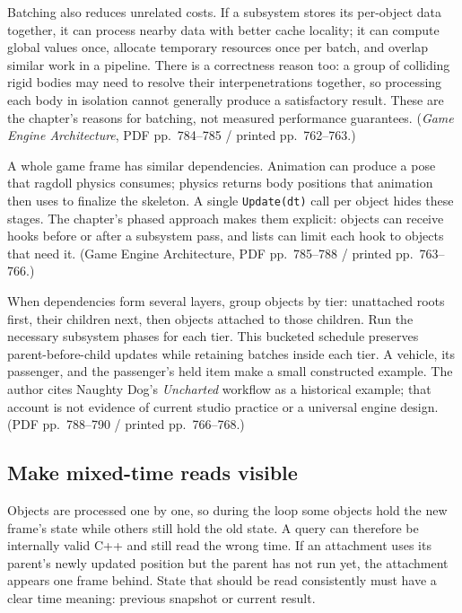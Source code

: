 Batching also reduces unrelated costs. If a subsystem stores its per-object data together, it can process nearby data with better cache locality; it can compute global values once, allocate temporary resources once per batch, and overlap similar work in a pipeline. There is a correctness reason too: a group of colliding rigid bodies may need to resolve their interpenetrations together, so processing each body in isolation cannot generally produce a satisfactory result. These are the chapter's reasons for batching, not measured performance guarantees. (\emph{Game Engine Architecture}, PDF pp.~784--785 / printed pp.~762--763.)

A whole game frame has similar dependencies. Animation can produce a pose that ragdoll physics consumes; physics returns body positions that animation then uses to finalize the skeleton. A single \texttt{Update(dt)} call per object hides these stages. The chapter's phased approach makes them explicit: objects can receive hooks before or after a subsystem pass, and lists can limit each hook to objects that need it. (Game Engine Architecture, PDF pp.~785--788 / printed pp.~763--766.)

When dependencies form several layers, group objects by tier: unattached roots first, their children next, then objects attached to those children. Run the necessary subsystem phases for each tier. This bucketed schedule preserves parent-before-child updates while retaining batches inside each tier. A vehicle, its passenger, and the passenger's held item make a small constructed example. The author cites Naughty Dog's \emph{Uncharted} workflow as a historical example; that account is not evidence of current studio practice or a universal engine design. (PDF pp.~788--790 / printed pp.~766--768.)

\subsection{Make mixed-time reads visible}\label{05-engine-i-ch014-make-mixed-time-reads-visible}

Objects are processed one by one, so during the loop some objects hold the new frame's state while others still hold the old state. A query can therefore be internally valid C++ and still read the wrong time. If an attachment uses its parent's newly updated position but the parent has not run yet, the attachment appears one frame behind. State that should be read consistently must have a clear time meaning: previous snapshot or current result.

